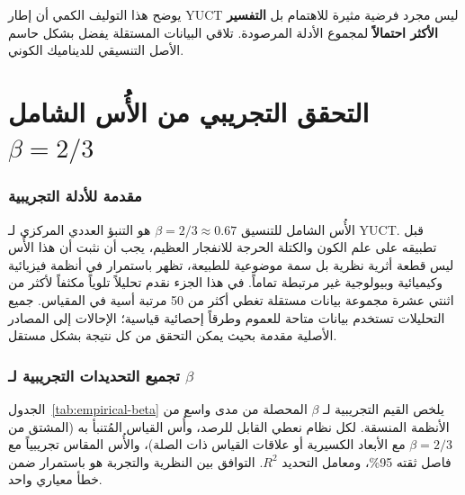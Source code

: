 \documentclass[12pt,a4paper]{article}
\begin{document}
	يوضح هذا التوليف الكمي أن إطار YUCT ليس مجرد فرضية مثيرة للاهتمام بل \textbf{التفسير الأكثر احتمالاً} لمجموع الأدلة المرصودة. تلاقي البيانات المستقلة يفضل بشكل حاسم الأصل التنسيقي للديناميك الكوني.
	
	\part{التحقق التجريبي من الأُس الشامل \(\beta = 2/3\)}
	\label{part:V}
	
	\section{مقدمة للأدلة التجريبية}
	
	الأُس الشامل للتنسيق \(\beta = 2/3 \approx 0.67\) هو التنبؤ العددي المركزي لـ YUCT. قبل تطبيقه على علم الكون والكتلة الحرجة للانفجار العظيم، يجب أن نثبت أن هذا الأُس ليس قطعة أثرية نظرية بل سمة موضوعية للطبيعة، تظهر باستمرار في أنظمة فيزيائية وكيميائية وبيولوجية غير مرتبطة تماماً. في هذا الجزء نقدم تحليلاً تلوياً مكثفاً لأكثر من اثنتي عشرة مجموعة بيانات مستقلة تغطي أكثر من 50 مرتبة أسية في المقياس. جميع التحليلات تستخدم بيانات متاحة للعموم وطرقاً إحصائية قياسية؛ الإحالات إلى المصادر الأصلية مقدمة بحيث يمكن التحقق من كل نتيجة بشكل مستقل.
	
	\section{تجميع التحديدات التجريبية لـ \(\beta\)}
	
	الجدول~\ref{tab:empirical-beta} يلخص القيم التجريبية لـ \(\beta\) المحصلة من مدى واسع من الأنظمة المنسقة. لكل نظام نعطي القابل للرصد، وأُس القياس المُتنبأ به (المشتق من \(\beta = 2/3\) مع الأبعاد الكسيرية أو علاقات القياس ذات الصلة)، والأُس المقاس تجريبياً مع فاصل ثقته 95\%، ومعامل التحديد \(R^2\). التوافق بين النظرية والتجربة هو باستمرار ضمن خطأ معياري واحد.
	
\end{document}
